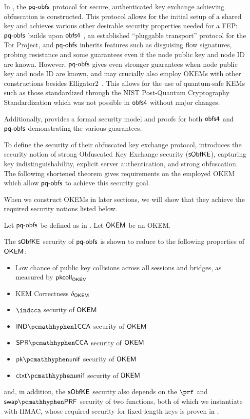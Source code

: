 In \cite{CCS:GunSteVei24}, the $\textsf{pq-obfs}$ protocol for secure, authenticated key exchange achieving obfuscation is constructed. This protocol allows for the initial setup of a shared key and achieves various other desirable security properties needed for a FEP:
$\textsf{pq-obfs}$ builds upon $\textsf{obfs4}$ \cite{obfs4}, an established ``pluggable transport'' protocol for the Tor Project, and $\textsf{pq-obfs}$ inherits features such as disguising flow signatures, probing resistance and some guarantees even if the node public key and node ID are known.
However, $\textsf{pq-obfs}$ gives even stronger guarantees when node public key and node ID are known, and may crucially also employ OKEMs with other constructions besides \textsf{Elligator2}~\cite{CCS:BHKL13}. This allows for the use of quantum-safe KEMs such as those standardized through the NIST Post-Quantum Cryptography Standardization \cite{nist-standardization} which was not possible in $\textsf{obfs4}$ without major changes.

Additionally, \cite{CCS:GunSteVei24} provides a formal security model and proofs for both $\textsf{obfs4}$ and $\textsf{pq-obfs}$ demonstrating the various guarantees.

To define the security of their obfuscated key exchange protocol, \cite{CCS:GunSteVei24} introduces the security notion of strong Obfuscated Key Exchange security ($\mathsf{sObfKE}$), capturing key indistinguishability, explicit server authentication, and strong obfuscation.
The following shortened theorem gives requirements on the employed OKEM which allow $\textsf{pq-obfs}$ to achieve this security goal.

When we construct OKEMs in later sections, we will show that they achieve the required security notions listed below.

\begin{theorem}
\label{thm:s-obfuscated-keyex-security}
    Let $\textsf{pq-obfs}$ be defined as in \cite[Fig. 7]{CCS:GunSteVei24}. Let $\mathsf{OKEM}$ be an OKEM.
    
    The $\mathsf{sObfKE}$ security of $\textsf{pq-obfs}$ is shown to reduce to the following properties of $\mathsf{OKEM}$:
    \begin{itemize}
        \item Low chance of public key collisions across all sessions and bridges, as measured by $\mathsf{pkcoll}_{\mathsf{OKEM}}$
        \item KEM Correctness $\delta_{\mathsf{OKEM}}$
        \item $\indcca$ security of $\mathsf{OKEM}$
        \item $\indonecca$ security of $\mathsf{OKEM}$
        \item $\sprcca$ security of $\mathsf{OKEM}$
        \item $\pkunif$ security of $\mathsf{OKEM}$
        \item $\ctxtunif$ security of $\mathsf{OKEM}$
    \end{itemize}

    and, in addition, the $\mathsf{sObfKE}$ security also depends on the $\prf$ and $\swapprf$ security of two functions, both of which we instantiate with HMAC, whose required security for fixed-length keys is proven in \cite{C:BBGS23}.
\end{theorem}